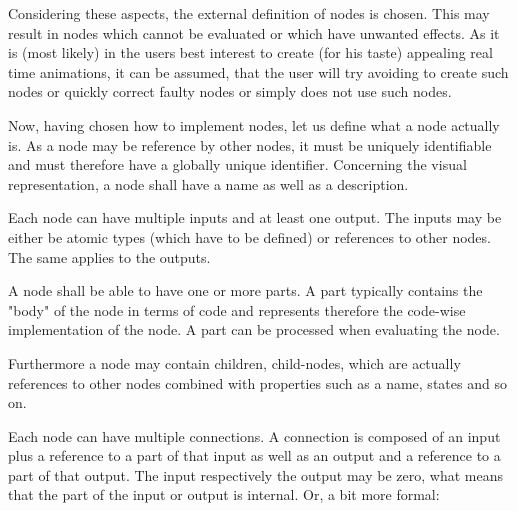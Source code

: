 \documentclass[
    a4paper,      %
    10pt,         %
    openright,    %
    notitlepage,  %
    parskip=half, %
]{scrreprt}       %
\theoremstyle{definition}                    %
\begin{document}
Considering these aspects, the external definition of nodes is chosen. This may
result in nodes which cannot be evaluated or which have unwanted effects. As it
is (most likely) in the users best interest to create (for his taste) appealing
real time animations, it can be assumed, that the user will try avoiding to
create such nodes or quickly correct faulty nodes or simply does not use such
nodes.

Now, having chosen how to implement nodes, let us define what a node actually
is. As a node may be reference by other nodes, it must be uniquely identifiable
and must therefore have a globally unique identifier. Concerning the visual
representation, a node shall have a name as well as a description.

Each node can have multiple inputs and at least one output. The inputs may be
either be atomic types (which have to be defined) or references to other nodes.
The same applies to the outputs.

A node shall be able to have one or more parts. A part typically contains the
"body" of the node in terms of code and represents therefore the code-wise
implementation of the node. A part can be processed when evaluating the node.

Furthermore a node may contain children, child-nodes, which are actually
references to other nodes combined with properties such as a name, states and so
on.

Each node can have multiple connections. A connection is composed of an input
plus a reference to a part of that input as well as an output and a reference to
a part of that output. The input respectively the output may be zero, what means
that the part of the input or output is internal. Or, a bit more formal:
\end{document}
